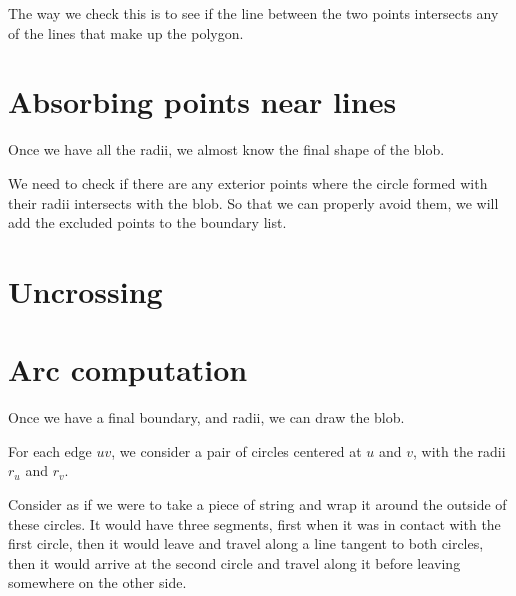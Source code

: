 \documentclass[paper=a4, fontsize=11pt]{scrartcl} %
\numberwithin{equation}{section} %
\numberwithin{figure}{section} %
\numberwithin{table}{section} %
\begin{document}
The way we check this is to see if the line between the two points intersects
any of the lines that make up the polygon.



\section{Absorbing points near lines}
Once we have all the radii, we almost know the final shape of the blob.

We need to check if there are any exterior points where the circle
formed with their radii intersects with the blob.
So that we can properly avoid them, we will add the excluded points to
the boundary list.



\section{Uncrossing}

\section{Arc computation}
Once we have a final boundary, and radii, we can draw the blob.

For each edge $uv$, we consider a pair of circles centered at
$u$ and $v$, with the radii $r_u$ and $r_v$.

Consider as if we were to take a piece of string and wrap it around
the outside of these circles.
It would have three segments,
first when it was in contact with the first circle,
then it would leave and travel along a line tangent to both circles,
then it would arrive at the second circle
and travel along it before leaving somewhere on the other side.




\end{document}
